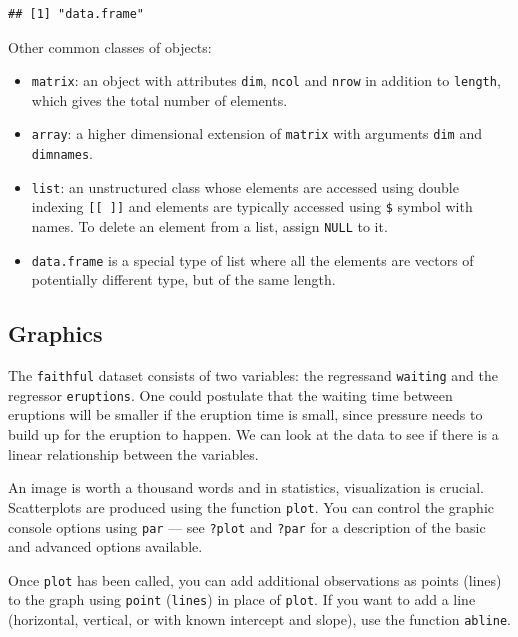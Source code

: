 \documentclass[
  11pt,
  letterpaper,
]{book}
\providecommand{\tightlist}{%
  \setlength{\itemsep}{0pt}\setlength{\parskip}{0pt}}
\theoremstyle{definition}
\theoremstyle{definition}
\theoremstyle{definition}
\theoremstyle{remark}
\begin{document}
\begin{verbatim}
## [1] "data.frame"
\end{verbatim}

Other common classes of objects:

\begin{itemize}
\tightlist
\item
  \texttt{matrix}: an object with attributes \texttt{dim}, \texttt{ncol} and \texttt{nrow} in addition to \texttt{length}, which gives the total number of elements.
\item
  \texttt{array}: a higher dimensional extension of \texttt{matrix} with arguments \texttt{dim} and \texttt{dimnames}.
\item
  \texttt{list}: an unstructured class whose elements are accessed using double indexing \texttt{{[}{[}\ {]}{]}} and elements are typically accessed using \texttt{\$} symbol with names. To delete an element from a list, assign \texttt{NULL} to it.
\item
  \texttt{data.frame} is a special type of list where all the elements are vectors of potentially different type, but of the same length.
\end{itemize}

\hypertarget{graphics}{%
\subsection{Graphics}\label{graphics}}

The \texttt{faithful} dataset consists of two variables: the regressand \texttt{waiting} and the regressor \texttt{eruptions}. One could postulate that the waiting time between eruptions will be smaller if the eruption time is small, since pressure needs to build up for the eruption to happen. We can look at the data to see if there is a linear relationship between the variables.

An image is worth a thousand words and in statistics, visualization is crucial. Scatterplots are produced using the function \texttt{plot}. You can control the graphic console options using \texttt{par} --- see \texttt{?plot} and \texttt{?par} for a description of the basic and advanced options available.

Once \texttt{plot} has been called, you can add additional observations as points (lines) to the graph using \texttt{point} (\texttt{lines}) in place of \texttt{plot}. If you want to add a line (horizontal, vertical, or with known intercept and slope), use the function \texttt{abline}.
\end{document}
